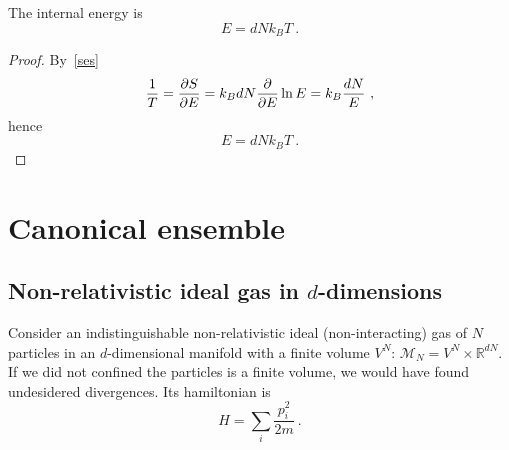     The internal energy is 
    \begin{equation*}
        E = d N k_B T ~.
    \end{equation*}
    \begin{proof}
        By~\eqref{ses}
        \begin{equation*}
            \frac{1}{T} = \frac{\partial S}{\partial E} = k_B dN \frac{\partial}{\partial E} \ln E = k_B \frac{dN}{E} ~,
        \end{equation*}
        hence 
        \begin{equation*}
            E = d N k_B T ~.
        \end{equation*}
    \end{proof}

\chapter{Canonical ensemble}

\section{Non-relativistic ideal gas in $d$-dimensions}

    Consider an indistinguishable non-relativistic ideal (non-interacting) gas of $N$ particles in an $d$-dimensional manifold with a finite volume $V^N$: $\mathcal M_N = V^N \times \mathbb R^{dN}$. If we did not confined the particles is a finite volume, we would have found undesidered divergences. Its hamiltonian is 
    \begin{equation*}
        H = \sum_i \frac{p^2_i}{2m} ~.
    \end{equation*}

